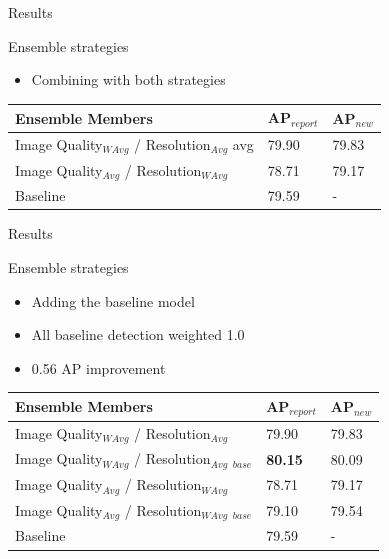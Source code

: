 \begin{frame}{Results}{}
    \begin{block}{Ensemble strategies}
    \begin{itemize}
        \item Combining with both strategies  
    \end{itemize}  
\end{block} 

    \begin{table}[]
    \centering
    \begin{tabular}{|l|l|l|}
    \hline
    \textbf{Ensemble Members} & \textbf{AP$_{report}$} & \textbf{AP$_{new}$} \\ \hline
    Image Quality$_{WAvg}$ / Resolution$_{Avg}$ avg                                          & 79.90     & 79.83  \\ \hline
    Image Quality$_{Avg}$ / Resolution$_{WAvg}$                                         & 78.71     & 79.17  \\ \hline
    Baseline                                                   & 79.59     & -      \\ \hline
    \end{tabular}
    \end{table}
\end{frame}

\begin{frame}{Results}{}
    \begin{block}{Ensemble strategies}
    \begin{itemize}
        \item Adding the baseline model
        \item All baseline detection weighted 1.0
        \item 0.56 AP improvement
    \end{itemize}  
\end{block} 
    \begin{table}[h]
    \centering
    \begin{tabular}{|l|l|l|}
    \hline
    \textbf{Ensemble Members}                  & \textbf{AP$_{report}$} & \textbf{AP$_{new}$} \\ \hline
    Image Quality$_{WAvg}$ / Resolution$_{Avg}$  & 79.90 & 79.83 \\ \hline
    Image Quality$_{WAvg}$ / Resolution$_{Avg}$ $_{base}$ & \textbf{80.15} & 80.09 \\ \hline
    Image Quality$_{Avg}$ / Resolution$_{WAvg}$ & 78.71 & 79.17 \\ \hline
    Image Quality$_{Avg}$ / Resolution$_{WAvg}$ $_{base}$ & 79.10 & 79.54\\ \hline
    Baseline                          & 79.59 & -\\ \hline
    \end{tabular}
    \end{table}
\end{frame}

